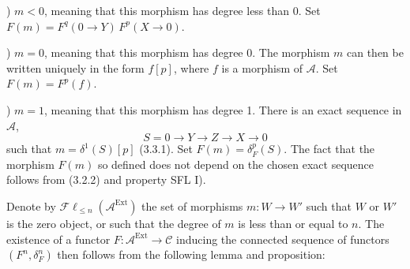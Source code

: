 ) $m<0$, meaning that this morphism has degree less than 0. Set
$F(m)=F^q(0\longrightarrow Y)\,F^p(X\longrightarrow0)$.

) $m=0$, meaning that this morphism has degree 0. The morphism $m$ can then be
written uniquely in the form $f[p]$, where $f$ is a morphism of
$\mathcal A$. Set $F(m)=F^p(f)$.

) $m=1$, meaning that this morphism has degree 1. There is an exact sequence in
$\mathcal A$,
\[
S=0\longrightarrow Y\longrightarrow Z\longrightarrow X\longrightarrow0
\]
such that $m=\delta^1(S)[p]$ (3.3.1). Set $F(m)=\delta_F^p(S)$. The fact
that the morphism $F(m)$ so defined does not depend on the chosen exact
sequence follows from (3.2.2) and property SFL I).

Denote by $\mathcal{F}\ell_{\leq n}(\mathcal A^{\operatorname{Ext}})$ the
set of morphisms $m\colon W\longrightarrow W'$ such that $W$ or $W'$ is
the zero object, or such that the degree of $m$ is less than or equal to
$n$. The existence of a functor
$F\colon\mathcal A^{\operatorname{Ext}}\longrightarrow\mathcal C$ inducing
the connected sequence of functors $(F^n,\delta_F^n)$ then follows from
the following lemma and proposition:
\endgroup
